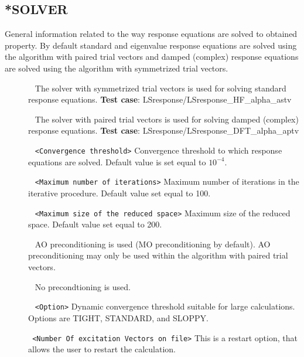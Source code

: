\subsection{*SOLVER}\label{subsec:responsesolver}
General information related to the way response equations are solved to obtained property.
By default standard and eigenvalue response equations are solved using the
algorithm with paired trial vectors\cite{coriani:2007} and damped
(complex) response equations are solved using the algorithm with
symmetrized trial vectors\cite{kauczor:2011}.\newline
\begin{description}
\item[] \verb| | \newline
The solver with symmetrized trial vectors is used for solving standard
response equations.\newline
{\bf Test case}: LSresponse/LSresponse\_HF\_alpha\_astv
\item[] \verb| | \newline
The solver with paired trial vectors is used for solving damped (complex)
response equations.\newline
{\bf Test case}: LSresponse/LSresponse\_DFT\_alpha\_aptv
\item[] \verb| | \newline
\verb|<Convergence threshold>|\newline
Convergence threshold to which response equations are solved.
Default value is set equal to $10^{-4}$.
\item[] \verb| | \newline
\verb|<Maximum number of iterations>|\newline
Maximum number of iterations in the iterative procedure.
Default value set equal to 100.
\item[] \verb| | \newline
\verb|<Maximum size of the reduced space>|\newline
Maximum size of the reduced space.
Default value set equal to 200.
\item[] \verb| | \newline
AO preconditioning is used (MO preconditioning by default).
AO preconditioning may only be used within the algorithm with paired trial vectors.
\item[] \verb| | \newline
No precondtioning is used.
\item[] \verb| | \newline
\verb|<Option>|\newline 
Dynamic convergence threshold suitable for large calculations.
Options are TIGHT, STANDARD, and SLOPPY.
\item[] \verb| | \newline
\verb|<Number Of excitation Vectors on file>|\newline 
This is a restart option, that allows the user to restart the calculation. 


\end{description}

